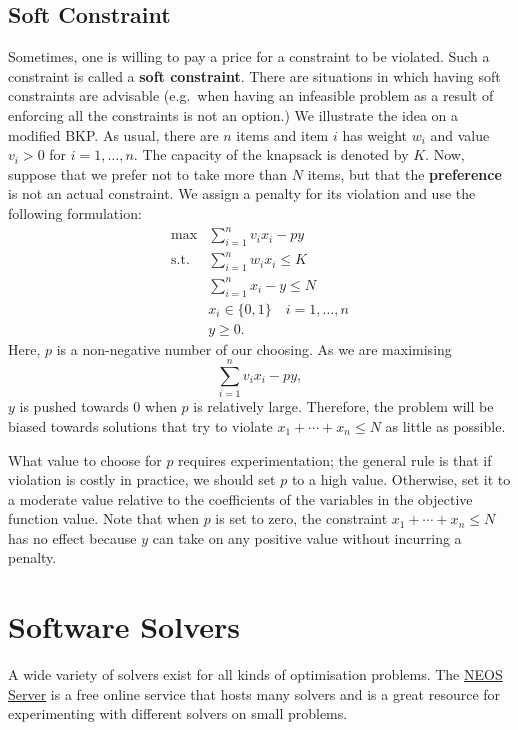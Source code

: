 \subsection{Soft Constraint}

Sometimes, one is willing to pay a price for a constraint to be
violated. Such a constraint is called a \textbf{soft constraint}. There
are situations in which having soft constraints are advisable (e.g.~when
having an infeasible problem as a result of enforcing all the
constraints is not an option.) We illustrate the idea on a modified
BKP. As usual, there are \(n\) items and item \(i\)
has weight \(w_i\) and value \(v_i>0\) for \(i = 1,\ldots, n\). The
capacity of the knapsack is denoted by \(K\). Now, suppose that we prefer not to take more than \(N\)
items,  but that the \textbf{preference} is not an actual constraint. We assign a penalty for its violation and use the following formulation:
\[\begin{array}{rl}
\max & \sum\limits_{i = 1}^n v_i x_i - p y\\
\mbox{s.t.} & \sum\limits_{i = 1}^n w_i x_i \leq K \\
  & \sum\limits_{i = 1}^n x_i - y \leq N \\
  & x_i \in \{0,1\} \quad i = 1,\ldots, n \\
  & y \geq 0.
\end{array}\] Here, \(p\) is a non-negative number of our choosing. As we
are maximising $$\sum\limits_{i = 1}^n v_i x_i - p y,$$ \(y\) is pushed
towards 0 when \(p\) is relatively large. Therefore, the problem will be
biased towards solutions that try to violate
$x_1+\cdots+x_n \leq N$ as little as possible.\par  What value to
choose for \(p\) requires experimentation; the general rule is that if
violation is costly in practice, we should set \(p\) to a high value. Otherwise, set it to a
moderate value relative to the coefficients of the variables in the
objective function value. Note that when \(p\) is set to zero, the
constraint $x_1+\cdots+x_n \leq N$ has no effect
because \(y\) can take on any positive value without incurring a
penalty.


\section{Software Solvers}

A wide variety of solvers exist for all kinds of optimisation problems.
The \href{https://neos-server.org/neos/}{NEOS Server} is a free online
service that hosts many solvers and is a great resource for
experimenting with different solvers on small problems.


